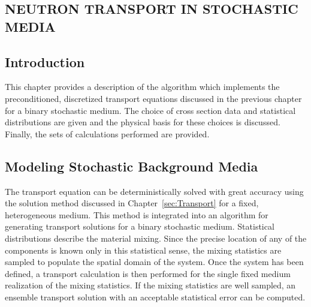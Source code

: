 \begin{center}
\section{NEUTRON TRANSPORT IN STOCHASTIC MEDIA}
\label{sec:StochMedTrans}
\end{center}

\aboveSubSecSkip

\subsection{Introduction}
\label{sec:StochMedTrans-Intro}

\noindent
	\indent This chapter provides a description of the algorithm which implements the preconditioned,
	discretized transport equations discussed in the previous chapter for a binary stochastic
	medium.  The choice of cross section data and statistical distributions are given and the 
	physical basis for these choices is discussed.  Finally, the sets of calculations performed 
	are provided.
		
\belowSubSecSkip

\subsection{Modeling Stochastic Background Media}
\label{sec:StochMedTrans-Med}

\noindent
	\indent The transport equation can be deterministically solved with great accuracy using
	the solution method discussed in Chapter~\ref{sec:Transport} for a fixed, heterogeneous 
	medium.  This method is integrated into an algorithm for generating transport solutions
	for a binary stochastic medium.   Statistical distributions describe the material mixing.  Since
	the
	precise location of any of the components is known only in this statistical sense, the mixing
	statistics are sampled to populate the spatial domain of the system.  Once the system has been
	defined, a transport calculation is then performed for the single
	fixed medium realization of the mixing statistics.  If the mixing statistics are well sampled, an
	ensemble transport solution with an acceptable statistical error can be computed.
	
